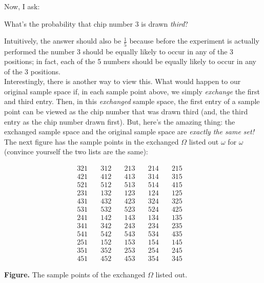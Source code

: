 \documentclass[12pt]{article}
\begin{document}
\noindent Now, I ask:
\begin{center}What's the probability that chip number 3 is drawn {\em third}?\end{center}
Intuitively, the answer should also be $\frac 15$ because before the experiment is actually performed the number 3 should be equally likely to occur in any of the 3 positions; in fact, each of the 5 numbers should be equally likely to occur in any of the 3 positions.\\


\noindent Interestingly, there is another way to view this. What would happen to our original sample space if, in each sample point above, we simply {\em exchange} the first and third entry.  Then, in this {\em exchanged} sample space, the first entry of a sample point can be viewed as the chip number that was drawn third (and, the third entry as the chip number drawn first).  But, here's the amazing thing: the exchanged sample space and the original sample space are {\em exactly the same set!}  The next figure has the sample points in the exchanged $\Omega$ listed out $\omega$ for $\omega$ (convince yourself the two lists are the same):

\newpage



$$\begin{array}{rrrrr}
321\quad &312\quad &213\quad &214\quad &215\quad \\
421\quad &412\quad &413\quad &314\quad &315\quad \\
521\quad &512\quad &513\quad &514\quad &415\quad \\
231\quad &132\quad &123\quad &124\quad &125\quad \\
431\quad &432\quad &423\quad &324\quad &325\quad \\
531\quad &532\quad &523\quad &524\quad &425\quad \\
241\quad &142\quad &143\quad &134\quad &135\quad \\
341\quad &342\quad &243\quad &234\quad &235\quad \\
541\quad &542\quad &543\quad &534\quad &435\quad \\
251\quad &152\quad &153\quad &154\quad &145\quad \\
351\quad &352\quad &253\quad &254\quad &245\quad \\
451\quad &452\quad &453\quad &354\quad &345\quad \end{array}$$
\begin{center}{\bf Figure.} The sample points of the exchanged $\Omega$ listed out.\end{center}
\end{document}
